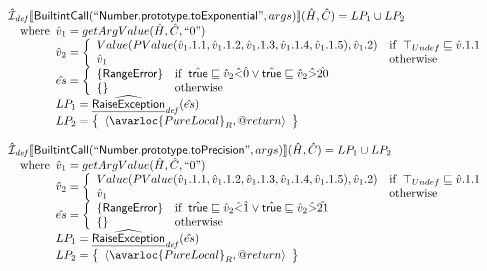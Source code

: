 \[\begin{array}{l}
\aI_{\it def}\lbr \SF{BuiltintCall}(``\SF{Number.prototype.toExponential}",args)\rbr(\hat{H},\hat{C}) = LP_1 \cup LP_2\\
\quad\wherec{
  \hat{v}_1 =getArgValue(\hat{H}, \hat{C}, ``0")\\
  \hat{v}_2 = \left\{\begin{array}{ll}
      Value(PValue(\hat{v}_1.1.1,\hat{v}_1.1.2,\hat{v}_1.1.3,
        \hat{v}_1.1.4,\hat{v}_1.1.5), \hat{v}_1.2)
      & \ifc{\top_{Undef} \sqsubseteq \hat{v}.1.1}\\
      \hat{v}_1 & \owc
    \end{array}\right.\\
  \hat{es} = \left\{\begin{array}{ll}
      \{ \SF{RangeError} \}
      & \ifc{\atrue \sqsubseteq \hat{v}_2 \hat{<} \hat{0} \lor \atrue \sqsubseteq \hat{v}_2 \hat{>} \hat{20}}\\
      \set{} & \owc
    \end{array}\right.\\
  LP_1 = \ahf{RaiseException}_{\it def}(\hat{es})\\
  LP_2 = \set{\langle\avarloc{PureLocal}_R,\varprop{return}\rangle}\\
  }\\
\\


\aI_{\it def}\lbr \SF{BuiltintCall}(``\SF{Number.prototype.toPrecision}",args)\rbr(\hat{H},\hat{C}) = LP_1 \cup LP_2\\
\quad\wherec{
  \hat{v}_1 =getArgValue(\hat{H}, \hat{C}, ``0")\\
  \hat{v}_2 = \left\{\begin{array}{ll}
      Value(PValue(\hat{v}_1.1.1,\hat{v}_1.1.2,\hat{v}_1.1.3,
        \hat{v}_1.1.4,\hat{v}_1.1.5), \hat{v}_1.2)
      & \ifc{\top_{Undef} \sqsubseteq \hat{v}.1.1}\\
      \hat{v}_1 & \owc
    \end{array}\right.\\
  \hat{es} = \left\{\begin{array}{ll}
      \{ \SF{RangeError} \}
      & \ifc{\atrue \sqsubseteq \hat{v}_2 \hat{<} \hat{1} \lor \atrue \sqsubseteq \hat{v}_2 \hat{>} \hat{21}}\\
      \set{} & \owc
    \end{array}\right.\\
  LP_1 = \ahf{RaiseException}_{\it def}(\hat{es})\\
  LP_2 = \set{\langle\avarloc{PureLocal}_R,\varprop{return}\rangle}\\
  }\\
\\

\end{array}
\]
